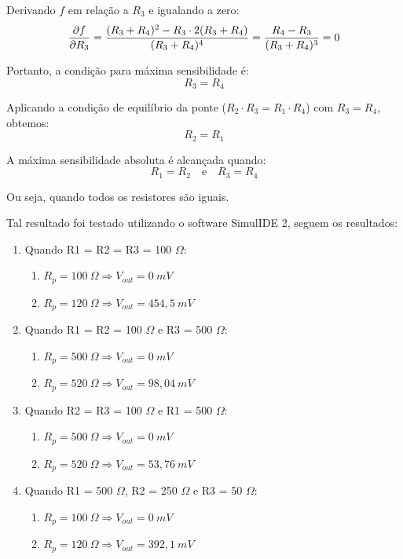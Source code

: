\documentclass[a4paper,oneside,10pt]{article}
\begin{document}
Derivando \(f\) em relação a \(R_3\) e igualando a zero:
$$
	\frac{\partial f}{\partial R_3} = \frac{(R_3 + R_4)^2 - R_3 \cdot 2(R_3 + R_4)}{(R_3 + R_4)^4} \\
	= \frac{R_4 - R_3}{(R_3 + R_4)^3} = 0
$$

Portanto, a condição para máxima sensibilidade é:
$$
	R_3 = R_4
$$

Aplicando a condição de equilíbrio da ponte (\(R_2 \cdot R_3 = R_1 \cdot R_4\)) com \(R_3 = R_4\), obtemos:
$$
	R_2 = R_1
$$

A máxima sensibilidade absoluta é alcançada quando:
$$
	\boxed{R_1 = R_2 \quad \text{e} \quad R_3 = R_4}
$$

Ou seja, quando todos os resistores são iguais.


Tal resultado foi testado utilizando o software SimulIDE 2, seguem os resultados:
\begin{enumerate}
	\item Quando R1 = R2 = R3 = 100 $\Omega$:
	\begin{enumerate}
	\item $R_p = 100\ \Omega \Rightarrow V_{out} = 0\ mV$
	\item $R_p = 120\ \Omega \Rightarrow V_{out} = 454,5\ mV$
\end{enumerate}
	\item Quando R1 = R2 = 100 $\Omega$ e R3 = 500 $\Omega$:
		\begin{enumerate}
	\item $R_p = 500\ \Omega \Rightarrow V_{out} = 0\ mV$
	\item $R_p = 520\ \Omega \Rightarrow V_{out} = 98,04\ mV$
\end{enumerate}
	\item Quando R2 = R3 = 100 $\Omega$ e R1 = 500 $\Omega$:
		\begin{enumerate}
	\item $R_p = 500\ \Omega \Rightarrow V_{out} = 0\ mV$
	\item $R_p = 520\ \Omega \Rightarrow V_{out} = 53,76\ mV$
\end{enumerate}
	\item Quando R1 = 500 $\Omega$, R2 = 250 $\Omega$ e R3 = 50 $\Omega$:
		\begin{enumerate}
	\item $R_p = 100\ \Omega \Rightarrow V_{out} = 0\ mV$
	\item $R_p = 120\ \Omega \Rightarrow V_{out} = 392,1\ mV$
\end{enumerate}
\end{enumerate}
\end{document}
